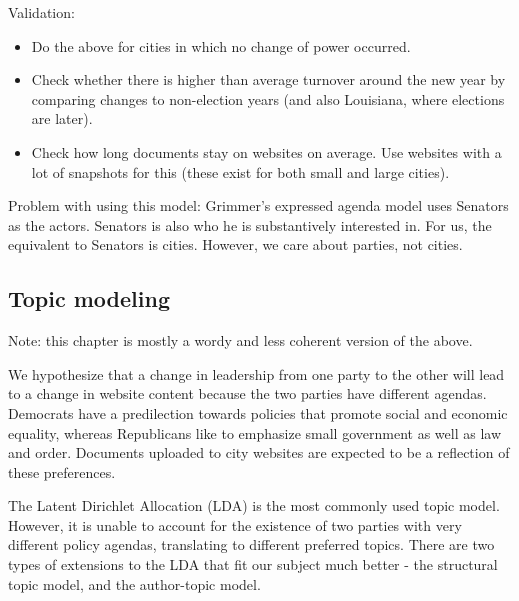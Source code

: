 \documentclass[11pt]{article}
\begin{document}
Validation:

\begin{itemize}
\item Do the above for cities in which no change of power occurred.
\item Check whether there is higher than average turnover around the new year by comparing changes to non-election years (and also Louisiana, where elections are later).
\item Check how long documents stay on websites on average. Use websites with a lot of snapshots for this (these exist for both small and large cities).
\end{itemize}

Problem with using this model: Grimmer's expressed agenda model uses Senators as the actors. Senators is also who he is substantively interested in. For us, the equivalent to Senators is cities. However, we care about parties, not cities.


\subsection{Topic modeling}
Note: this chapter is mostly a wordy and less coherent version of the above.

We hypothesize that a change in leadership from one party to the other will lead to a change in website content because the two parties have different agendas. Democrats have a predilection towards policies that promote social and economic equality, whereas Republicans like to emphasize small government as well as law and order. Documents uploaded to city websites are expected to be a reflection of these preferences.

The Latent Dirichlet Allocation (LDA) \citep{Blei2003} is the most commonly used topic model. However, it is unable to account for the existence of two parties with very different policy agendas, translating to different preferred topics. There are two types of extensions to the LDA that fit our subject much better - the structural topic model, and the author-topic model.
\end{document}

